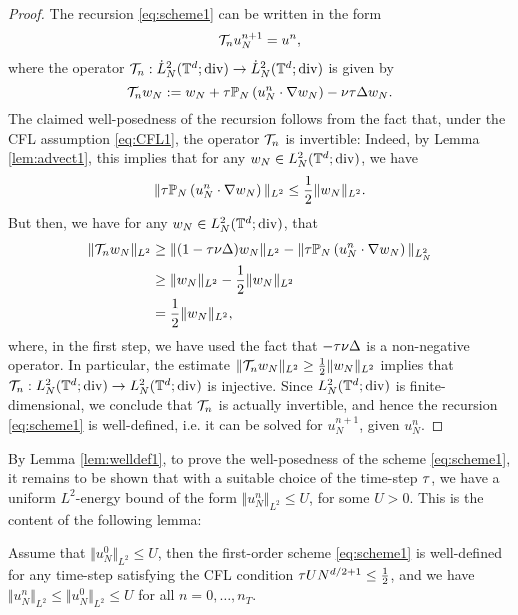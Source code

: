 \documentclass[reqno,a4paper]{amsart}
\begin{document}
\begin{proof}
The recursion \eqref{eq:scheme1} can be written in the form 
\begin{align} \label{eq:recL}
\mathcal{T}_n
u^{n+1}_N
=
u^n,
\end{align}
where the operator $\mathcal{T}_n: \dot{L}^2_N(\mathbb{T}^d;{\mathrm{div}})\to \dot{L}^2_N(\mathbb{T}^d;{\mathrm{div}})$ is given by
\[
\mathcal{T}_n w_N
:=
w_N + {\tau} \mathbb{P}_N \left(u^n_N  \cdot \nabla w_N\right) - \nu {\tau} \Delta w_N.
\]
The claimed well-posedness of the recursion follows from the fact that, under the CFL assumption \eqref{eq:CFL1}, the operator $\mathcal{T}_n$ is invertible: Indeed, by Lemma \ref{lem:advect1}, this implies that for any $w_N \in L^2_N(\mathbb{T}^d;{\mathrm{div}})$, we have
\[
\Vert {\tau} \mathbb{P}_N\left(u^n_N \cdot \nabla w_N\right) \Vert_{L^2} 
\le
\frac12 \Vert w_N \Vert_{L^2}.
\]
But then, we have for any $w_N \in L^2_N(\mathbb{T}^d;{\mathrm{div}})$, that 
\begin{align*}
\Vert \mathcal{T}_n w_N \Vert_{L^2}
&\ge 
\Vert (1-{\tau} \nu \Delta) w_N \Vert_{L^2} 
- 
\Vert {\tau} \mathbb{P}_N\left(u^n_N \cdot \nabla w_N\right) \Vert_{L^2_N} 
\\
&\ge
\Vert w_N \Vert_{L^2} - \frac{1}{2} \Vert w_N \Vert_{L^2}
\\
&=
\frac{1}{2} \Vert w_N \Vert_{L^2},
\end{align*}
where, in the first step, we have used the fact that $-{\tau} \nu \Delta$ is a non-negative operator. In particular, the estimate $\Vert \mathcal{T}_n w_N\Vert_{L^2} \ge \frac12 \Vert w_N\Vert_{L^2}$ implies that $\mathcal{T}_n: L^2_N(\mathbb{T}^d;{\mathrm{div}}) \to L^2_N(\mathbb{T}^d;{\mathrm{div}})$ is injective. Since $L^2_N(\mathbb{T}^d;{\mathrm{div}})$ is finite-dimensional, we conclude that $\mathcal{T}_n$ is actually invertible, and hence the recursion \eqref{eq:scheme1} is well-defined, i.e. it can be solved for $u^{n+1}_N$, given $u^n_N$.
\end{proof}

By Lemma \ref{lem:welldef1}, to prove the well-posedness of the scheme \eqref{eq:scheme1}, it remains to be shown that with a suitable choice of the time-step ${\tau}$, we have a uniform $L^2$-energy bound of the form $\Vert u^n_N \Vert_{L^2} \le U$, for some $U>0$. This is the content of the following lemma:

\begin{lemma} \label{lem:energyest1}
Assume that $\Vert u^0_N \Vert_{L^2} \le U$, then the first-order scheme \eqref{eq:scheme1} is well-defined for any time-step satisfying the CFL condition ${\tau} U N^{d/2+1} \le \frac12$, and we have $\Vert u^{n}_N \Vert_{L^2} \le \Vert u^0_N \Vert_{L^2}\le U$ for all $n=0,\dots, n_T$.
\end{lemma}
\end{document}
